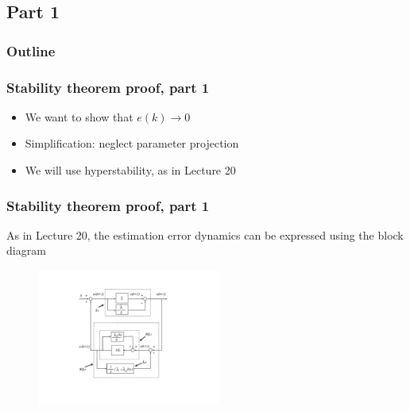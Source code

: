 \subsection{Part 1}
\begin{frame}
    \frametitle{Outline}
    \tableofcontents[currentsection]
\end{frame}

\begin{frame}
    \frametitle{Stability theorem proof, part 1}

    \begin{itemize}
        \item
        We want to show that $e(k) \rightarrow 0$

        \item
        Simplification: neglect parameter projection

        \item
        We will use hyperstability, as in Lecture 20
    \end{itemize}
\end{frame}

\begin{frame}
    \frametitle{Stability theorem proof, part 1}

    As in Lecture 20, the estimation error dynamics can be expressed using the block diagram
    \begin{figure}[h]
        \centering
        \includegraphics[width=6cm]{figs_hyperstability}\\
    \end{figure}
\end{frame}

